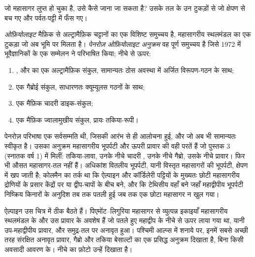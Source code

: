 जो महासागर लुप्त हो चुका है, उसे कैसे जाना जा सकता है? उसके तल के उन टुकड़ों से जो
क्षेपण से बच गए और पर्वत-पट्टी में फँस गए।

\begin{definition}[ओफ़ियोलाइट; पेनरोज़ ओफ़ियोलाइट अनुक्रम]\label{def:b2:alpine-orogen:ophiolite}
\emph{ओफ़ियोलाइट} मैफ़िक से अल्ट्रामैफ़िक चट्टानों का एक विशिष्ट समुच्चय है,
महासागरीय स्थलमंडल का एक टुकड़ा जो अब भूमि पर मिलता है। \emph{पेनरोज़ ओफ़ियोलाइट
अनुक्रम} वह पूर्ण समुच्चय है जिसे 1972 में भूवैज्ञानिकों के एक
सम्मेलन ने परिभाषित किया; नीचे से ऊपर:
\begin{enumerate}
\item {},  और  का एक अल्ट्रामैफ़िक संकुल, सामान्यतः
ठोस अवस्था में अर्जित विरूपण-गठन के साथ;
\item एक गैब्रोई संकुल, साधारणतः क्यूम्यूलस गठनों के साथ;
\item एक मैफ़िक चादरी डाइक-संकुल;
\item एक मैफ़िक ज्वालामुखीय संकुल, प्रायः तकिया-रूपी।
\end{enumerate}
\end{definition}

पेनरोज़ परिभाषा एक सर्वसम्मति थी, जिसकी आरंभ से ही आलोचना हुई, और जो अब भी सामान्यतः
स्वीकृत है। उसका अनुक्रम महासागरीय भूपर्पटी और ऊपरी प्रावार की वही परतें हैं जो पुस्तक 3
(स्नातक वर्ष 1) में मिलीं: तकिया-लावा, उनके नीचे चादरी , उनके नीचे गैब्रो, उसके नीचे प्रावार। फिर भी 
औसत महासागर-तल नहीं हैं। अधिकांश वितलीय भूपर्पटी, यानी विस्तृत महासागरों की भूपर्पटी, क्षेपण
में खप जाती है; कोलमैन का तर्क था कि ऐल्पाइन और कॉर्डिलेरी पट्टियों के 
मुख्यतः छोटी महासागरीय द्रोणियों के प्रसार केंद्रों पर या द्वीप-चापों के बीच बने, और कि
टेथिसीय  वहाँ बने जहाँ महाद्वीपीय भूपर्पटी निष्क्रिय किनारों के अनुदिश तब तक पतली हुई जब तक एक छोटा
महासागर न खुल गया।

ऐल्पाइन  उस चित्र में ठीक बैठते हैं। पिएमोंट--लिगुरिया महासागर से व्युत्पन्न इकाइयाँ
महासागरीय स्थलमंडल के और उस प्रावार के अवशेष हैं जो पतले हुए महाद्वीप के नीचे से
ऊपर लाया गया था, यानी उप-महाद्वीपीय प्रावार, और समुद्र-तल पर अनावृत हुआ।
पश्चिमी आल्प्स में शनाये पर, इनमें सबसे अच्छी तरह संरक्षित  अनावृत
प्रावार, गैब्रो और तकिया बेसाल्टों का एक प्रसिद्ध अनुक्रम दिखाता है, बिना किसी अवसादी आवरण के।
नीचे का फ़ोटो उन्हें दिखाता है।

